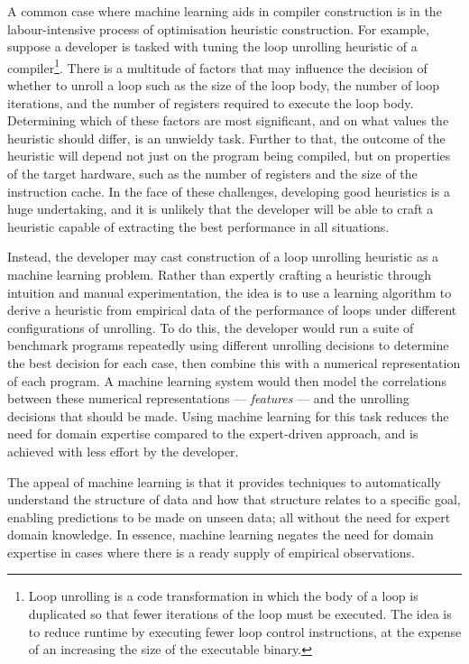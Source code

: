 A common case where machine learning aids in compiler construction is in the labour-intensive process of optimisation heuristic construction. For example, suppose a developer is tasked with tuning the loop unrolling heuristic of a compiler\footnote{Loop unrolling is a code transformation in which the body of a loop is duplicated so that fewer iterations of the loop must be executed. The idea is to reduce runtime by executing fewer loop control instructions, at the expense of an increasing the size of the executable binary.}. There is a multitude of factors that may influence the decision of whether to unroll a loop such as the size of the loop body, the number of loop iterations, and the number of registers required to execute the loop body. Determining which of these factors are most significant, and on what values the heuristic should differ, is an unwieldy task. Further to that, the outcome of the heuristic will depend not just on the program being compiled, but on properties of the target hardware, such as the number of registers and the size of the instruction cache. In the face of these challenges, developing good heuristics is a huge undertaking, and it is unlikely that the developer will be able to craft a heuristic capable of extracting the best performance in all situations.

Instead, the developer may cast construction of a loop unrolling heuristic as a machine learning problem. Rather than expertly crafting a heuristic through intuition and manual experimentation, the idea is to use a learning algorithm to derive a heuristic from empirical data of the performance of loops under different configurations of unrolling. To do this, the developer would run a suite of benchmark programs repeatedly using different unrolling decisions to determine the best decision for each case, then combine this with a numerical representation of each program. A machine learning system would then model the correlations between these numerical representations --- \emph{features} --- and the unrolling decisions that should be made. Using machine learning for this task reduces the need for domain expertise compared to the expert-driven approach, and is achieved with less effort by the developer.

The appeal of machine learning is that it provides techniques to automatically understand the structure of data and how that structure relates to a specific goal, enabling predictions to be made on unseen data; all without the need for expert domain knowledge. In essence, machine learning negates the need for domain expertise in cases where there is a ready supply of empirical observations.

